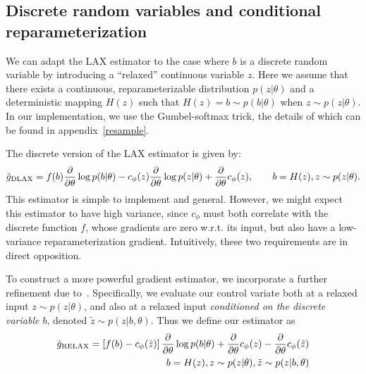 \documentclass{article}
\newcommand{\PT}{\frac{\partial}{\partial \theta}}
\newcommand{\LAX}{{\textnormal{LAX}}}
\newcommand{\DLAX}{{\textnormal{DLAX}}}
\begin{document}
\subsection{Discrete random variables and conditional reparameterization}
We can adapt the \LAX{} estimator to the case where $b$ is a discrete random variable by introducing a ``relaxed'' continuous variable $z$. %
Here we assume that there exists a continuous, reparameterizable distribution $p(z|\theta)$ and a deterministic mapping $H(z)$ such that $H(z) = b \sim p(b|\theta)$ when $z \sim p(z|\theta)$.
In our implementation, we use the Gumbel-softmax trick, the details of which can be found in appendix~\ref{resample}.

The discrete version of the \LAX{} estimator is given by:
%
\begin{align}
\label{eq:discrete lax}
\hat g_\DLAX = f(b) \PT \log p(b|\theta) - c_\phi(z) \PT \log p(z|\theta) + \PT c_\phi(z), \qquad b = H(z), z \sim p(z|\theta).
\end{align}
%
This estimator is simple to implement and general.
However, we might expect this estimator to have high variance, since $c_\phi$ must both correlate with the discrete function $f$, whose gradients are zero w.r.t. its input, but also have a low-variance reparameterization gradient.
Intuitively, these two requirements are in direct opposition.

To construct a more powerful gradient estimator, we incorporate a further refinement due to~\cite{tucker2017rebar}.
Specifically, we evaluate our control variate both at a relaxed input $z \sim p(z|\theta)$, and also at a relaxed input \emph{conditioned on the discrete variable $b$}, denoted $\tilde z \sim p(z|b, \theta)$. 
Thus we define our estimator as
%
\begin{align}
\hat g_\textnormal{RELAX} = \left[ f(b) - c_\phi(\hat{z}) \right] \PT \log p(b|\theta) + \PT c_\phi(z) - \PT c_\phi (\tilde{z}) \\
\qquad b = H(z), z \sim p(z|\theta), \tilde{z} \sim p(z|b, \theta) \nonumber
\end{align}
%
\end{document}
